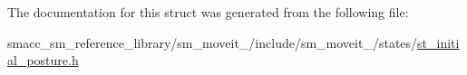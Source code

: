 The documentation for this struct was generated from the following file\+:\begin{DoxyCompactItemize}
\item 
smacc\+\_\+sm\+\_\+reference\+\_\+library/sm\+\_\+moveit\+\_/include/sm\+\_\+moveit\+\_/states/\hyperlink{3_2include_2sm__moveit__3_2states_2st__initial__posture_8h}{st\+\_\+initial\+\_\+posture.\+h}\end{DoxyCompactItemize}
